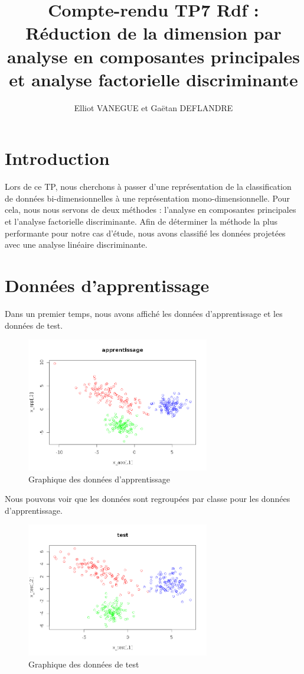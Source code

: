 \documentclass[a4paper,11pt]{article}
\title{Compte-rendu TP7 Rdf : Réduction de la dimension par analyse en composantes principales et analyse factorielle discriminante}
\author{Elliot VANEGUE et Gaëtan DEFLANDRE}
\begin{document}


  \maketitle
  
  \mbox{}
  \newpage
  \clearpage
  
  \section*{Introduction}
  Lors de ce TP, nous cherchons à passer d'une représentation de la classification de données
  bi-dimensionnelles à une représentation mono-dimensionnelle. Pour cela, nous nous servons de
  deux méthodes : l'analyse en composantes principales et l'analyse factorielle discriminante.
  Afin de déterminer la méthode la plus performante pour notre cas d'étude, nous avons classifié
  les données projetées avec une analyse linéaire discriminante.
 
  \section{Données d'apprentissage}
  Dans un premier temps, nous avons affiché les données d'apprentissage et les données de test.
  
  \begin{figure}[H]
    \center
   \includegraphics[width=8cm]{donnees_apprentissage.png}
   \caption{Graphique des données d'apprentissage}
  \end{figure}
  
  Nous pouvons voir que les données sont regroupées par classe pour les données d'apprentissage.
  
  \begin{figure}[H]
  \center
   \includegraphics[width=8cm]{donnees_test.png}
   \caption{Graphique des données de test}
  \end{figure}
  
\end{document}
